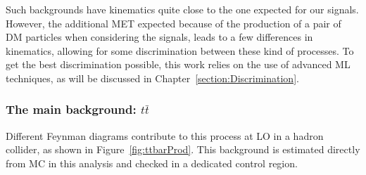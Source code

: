 \documentclass[a4paper, 10pt, openright]{report}
\begin{document}
Such backgrounds have kinematics quite close to the one expected for our signals. However, the additional \ac{MET} expected because of the production of a pair of \ac{DM} particles when considering the signals, leads to a few differences in kinematics, allowing for some discrimination between these kind of processes. To get the best discrimination possible, this work relies on the use of advanced \acf{ML} techniques, as will be discussed in Chapter~\ref{section:Discrimination}.

\subsubsection{The main background: $t \bar t$} \label{subsection:ttbar}


Different Feynman diagrams contribute to this process at \ac{LO} in a hadron collider, as shown in Figure~\ref{fig:ttbarProd}. This background is estimated directly from \ac{MC} in this analysis and checked in a dedicated control region.
\end{document}
